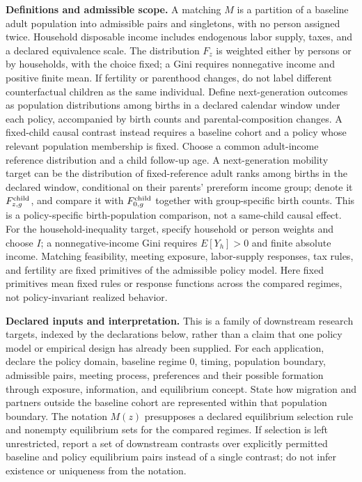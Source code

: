 \documentclass[11pt,a4paper]{article}
\begin{document}
\textbf{Definitions and admissible scope.} A matching \(M\) is a partition of a baseline adult population into admissible pairs and singletons, with no person assigned twice. Household disposable income includes endogenous labor supply, taxes, and a declared equivalence scale. The distribution \(F_z\) is weighted either by persons or by households, with the choice fixed; a Gini requires nonnegative income and positive finite mean. If fertility or parenthood changes, do not label different counterfactual children as the same individual. Define next-generation outcomes as population distributions among births in a declared calendar window under each policy, accompanied by birth counts and parental-composition changes. A fixed-child causal contrast instead requires a baseline cohort and a policy whose relevant population membership is fixed. Choose a common adult-income reference distribution and a child follow-up age. A next-generation mobility target can be the distribution of fixed-reference adult ranks among births in the declared window, conditional on their parents' prereform income group; denote it \(F^{\rm child}_{z,g}\), and compare it with \(F^{\rm child}_{0,g}\) together with group-specific birth counts. This is a policy-specific birth-population comparison, not a same-child causal effect. For the household-inequality target, specify household or person weights and choose \(I\); a nonnegative-income Gini requires \(E[Y_h]>0\) and finite absolute income. Matching feasibility, meeting exposure, labor-supply responses, tax rules, and fertility are fixed primitives of the admissible policy model. Here fixed primitives mean fixed rules or response functions across the compared regimes, not policy-invariant realized behavior.

\textbf{Declared inputs and interpretation.} This is a family of downstream research targets, indexed by the declarations below, rather than a claim that one policy model or empirical design has already been supplied. For each application, declare the policy domain, baseline regime \(0\), timing, population boundary, admissible pairs, meeting process, preferences and their possible formation through exposure, information, and equilibrium concept. State how migration and partners outside the baseline cohort are represented within that population boundary. The notation \(M(z)\) presupposes a declared equilibrium selection rule and nonempty equilibrium sets for the compared regimes. If selection is left unrestricted, report a set of downstream contrasts over explicitly permitted baseline and policy equilibrium pairs instead of a single contrast; do not infer existence or uniqueness from the notation.
\end{document}
